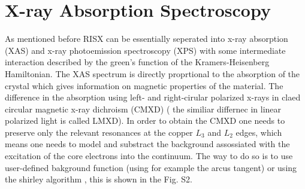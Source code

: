 \documentclass[twoside,twocolumn, elsart]{article}
\begin{document}
\section{X-ray Absorption Spectroscopy}
As mentioned before RISX can be essentially seperated into x-ray absorption (XAS) and x-ray photoemission spectroscopy (XPS) with some intermediate interaction described by the green's function of the Kramers-Heisenberg Hamiltonian. The XAS spectrum is directly proprtional to the absorption of the crystal which gives information on magnetic properties of the material. The difference in the absorption using left- and right-cirular polarized x-rays in claed circular magnetic x-ray dichroism (CMXD) ( the similiar differnec in linear polarized light is called LMXD). In order to obtain the CMXD one needs to preserve only the relevant resonances at the copper $L_3$ and $L_2$ edges, which means one needs to model and substract the background assossiated with the excitation of the core electrons into the continuum. The way to do so is to use user-defined bakground function (using for example the arcus tangent) or using the shirley algorithm \cite{Gomez,Shirley}, this is shown in the Fig. S2.
\end{document}

